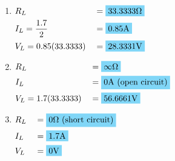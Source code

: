 \newpage
\begin{enumerate}[leftmargin=2cm,labelsep=.5cm,label=\bfseries\alph*)]
\item $
\begin{aligned}[t]
&R_L & &= \hlbox{33.3333\qw{\ohm}} \\
&I_L = \frac{1.7}{2} & &= \hlbox{0.85\qw{\A}}\\
&V_L = 0.85(33.3333) & &= \hlbox{28.3331\qw{\V}}
\end{aligned} $
\\[1cm]

\item $
\begin{aligned}[t]
&R_L & &= \hlbox{$\infty\qw{\ohm}$} \\
&I_L & &= \hlbox{0\qw{\A} (open circuit)}\\
&V_L = 1.7(33.3333) & &= \hlbox{56.6661\qw{\V}}
\end{aligned} $
\\[1cm]

\item $
\begin{aligned}[t]
&R_L & &= \hlbox{0\qw{\ohm} (short circuit)} \\
&I_L & &= \hlbox{1.7\qw{\A}}\\
&V_L & &= \hlbox{0\qw{\V}}
\end{aligned} $
\\[1cm]
\end{enumerate}